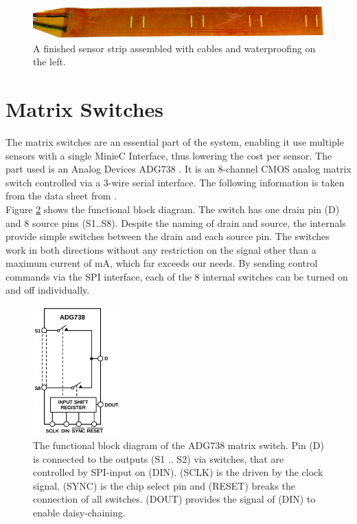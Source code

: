 \begin{figure}
	\begin{center}
		\includegraphics[width=\textwidth]{images/fpcbp.jpg} 
		\caption{A finished sensor strip assembled with cables and waterproofing on the left.}
		\label{fig:fpcbp}
	\end{center}
\end{figure}

\section{Matrix Switches}

The matrix switches are an essential part of the system, enabling it use multiple sensors with a single MinieC Interface, thus lowering the cost per sensor. The part used is an Analog Devices ADG738 . It is an 8-channel CMOS analog matrix switch controlled via a 3-wire serial interface. The following information is taken from the data sheet from \textcite{ms}.\\

Figure \ref{fig:ms} shows the functional block diagram. The switch has one drain pin (D) and 8 source pins (S1..S8). Despite the naming of drain and source, the internals provide simple switches between the drain and each source pin. The switches work in both directions without any restriction on the signal other than a maximum current of \unit[120]{mA}, which far exceeds our needs. By sending control commands via the SPI interface, each of the 8 internal switches can be turned on and off individually.\\

\begin{figure}
	\begin{center}
		\includegraphics[width=0.3\textwidth]{images/ms.pdf} 
		\caption{The functional block diagram of the ADG738 matrix switch. Pin (D) is connected to the outputs (S1 .. S2) via switches, that are controlled by SPI-input on (DIN). (SCLK) is the driven by the clock signal, (SYNC) is the chip select pin and (RESET) breaks the connection of all switches. (DOUT) provides the signal of (DIN) to enable daisy-chaining.}
		\label{fig:ms}
	\end{center}
\end{figure}

